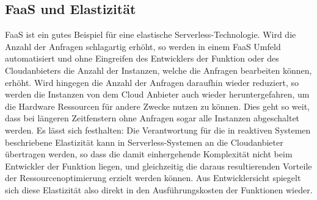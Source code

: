\subsection{FaaS und Elastizität}
FaaS ist ein gutes Beispiel für eine elastische Serverless-Technologie. Wird die Anzahl der Anfragen schlagartig erhöht, so werden in einem FaaS Umfeld automatisiert und ohne Eingreifen des Entwicklers der Funktion oder des Cloudanbieters die Anzahl der Instanzen, welche die Anfragen bearbeiten können, erhöht. Wird hingegen die Anzahl der Anfragen daraufhin wieder reduziert, so werden die Instanzen von dem Cloud Anbieter auch wieder heruntergefahren, um die Hardware Ressourcen für andere Zwecke nutzen zu können. Dies geht so weit, dass bei längeren Zeitfenstern ohne Anfragen sogar alle Instanzen abgeschaltet werden. Es lässt sich festhalten: Die Verantwortung für die in reaktiven Systemen beschriebene Elastizität kann in Serverless-Systemen an die Cloudanbieter übertragen werden, so dass die damit einhergehende Komplexität nicht beim Entwickler der Funktion liegen, und gleichzeitig die daraus resultierenden Vorteile der Ressourcenoptimierung erzielt werden können. Aus Entwicklersicht spiegelt sich diese Elastizität also direkt in den Ausführungskosten der Funktionen wieder.